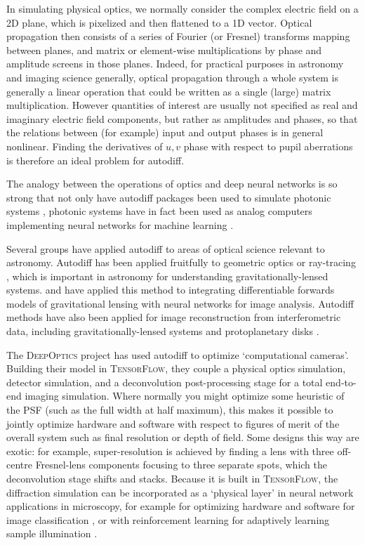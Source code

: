 \documentclass[modern]{aastex63}
\begin{document}
In simulating physical optics, we normally consider the complex electric field on a 2D plane, which is pixelized and then flattened to a 1D vector.
Optical propagation then consists of a series of Fourier (or  Fresnel) transforms mapping between planes, and matrix or element-wise multiplications by phase and amplitude screens in those planes. Indeed, for practical purposes in astronomy and imaging science generally, optical propagation through a whole system is generally a linear operation that could be written as a single (large) matrix multiplication. However quantities of interest are usually not specified as real and imaginary electric field components, but rather as amplitudes and phases, so that the relations between (for example) input and output phases is in general nonlinear. Finding the derivatives of $u,v$ phase with respect to pupil aberrations is therefore an ideal problem for autodiff.

The analogy between the operations of optics and deep neural networks is so strong that not only have autodiff packages been used to simulate photonic systems \citep[e.g.][]{hughes18}, photonic systems have in fact been used as analog computers implementing neural networks for machine learning \citep{hughes19,guo19}. 

Several groups have applied autodiff to areas of optical science relevant to astronomy. Autodiff has been applied fruitfully to geometric optics or ray-tracing \citep[e.g.][]{werner2012,sutin16}, which is important in astronomy for understanding gravitationally-lensed systems. \citet{chianese19} and \citet{morningstar19} have applied this method to integrating differentiable forwards models of gravitational lensing with neural networks for image analysis. Autodiff methods have also been applied for image reconstruction from interferometric data, including gravitationally-lensed systems \citep{morningstar18} and protoplanetary disks \citep{czekala19}.

The \textsc{DeepOptics} project \citep{sitzmann2018} has used autodiff to optimize `computational cameras'. Building their model in \textsc{TensorFlow}, they couple a physical optics simulation, detector simulation, and a deconvolution post-processing stage for a total end-to-end imaging simulation. Where normally you might optimize some heuristic of the PSF (such as the full width at half maximum), this makes it possible to jointly optimize hardware and software with respect to figures of merit of the overall system such as final resolution or depth of field. Some designs this way are exotic: for example, super-resolution is achieved by finding a lens with three off-centre Fresnel-lens components focusing to three separate spots, which the deconvolution stage shifts and stacks. Because it is built in \textsc{TensorFlow}, the diffraction simulation can be incorporated as a `physical layer' in neural network applications in microscopy, for example for optimizing hardware and software for image classification \citep{muthumbi19}, or with reinforcement learning for adaptively learning sample illumination \citet{chaware19}.
\end{document}
